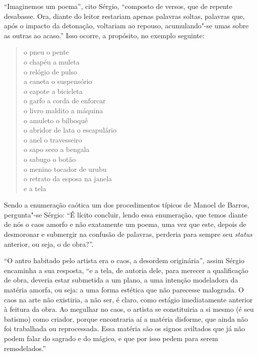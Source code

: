 ``Imaginemos um poema'', cito Sérgio, ``composto de versos, que de
repente desabasse. Ora, diante do leitor restariam apenas palavras
soltas, palavras que, após o impacto da detonação, voltariam ao repouso,
acumulando"-se umas sobre as outras ao acaso.'' Isso ocorre, a propósito,
no exemplo seguinte:

\begin{verse}
o pneu o pente \\
o chapéu a muleta \\
o relógio de pulso \\
a caneta o suspensório \\
o capote a bicicleta \\
o garfo a corda de enforcar \\
o livro maldito a máquina \\
o amuleto o bilboquê \\
o abridor de lata o escapulário \\
o anel o travesseiro \\
o sapo seco a bengala \\
o sabugo o botão \\
o menino tocador de urubu \\
o retrato da esposa na janela \\
e a tela
\end{verse}

Sendo a enumeração caótica um dos procedimentos típicos de Manoel de
Barros, pergunta"-se Sérgio: ``É lícito concluir, lendo essa enumeração,
que temos diante de nós o caos amorfo e não exatamente um poema, uma vez
que este, depois de desmoronar e submergir na confusão de palavras,
perderia para sempre seu \emph{status} anterior, ou seja, o de
obra?''.

``O antro habitado pelo artista era o caos, a desordem originária'',
assim Sérgio encaminha a sua resposta, ``e a tela, de autoria dele,
para merecer a qualificação de obra, deveria estar submetida a um plano,
a uma intenção modeladora da matéria amorfa, ou seja: a uma forma
estética que não parecesse malograda. O caos na arte não existiria, a
não ser, é claro, como estágio imediatamente anterior à feitura da obra.
Ao megulhar no caos, o artista se constituiria a si mesmo (é seu
batismo) como criador, porque encontraria aí a matéria disforme, que
ainda não foi trabalhada ou reprocessada. Essa matéria são os signos
aviltados que já não podem falar do sagrado e do mágico, e que por isso
pedem para serem remodelados.''

